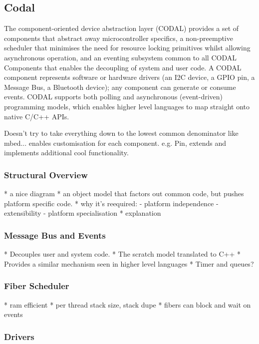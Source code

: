 \subsection{Codal}

The component-oriented device abstraction layer (CODAL) provides a set of components that abstract away microcontroller specifics, a non-preemptive scheduler that minimises the need for resource locking primitives whilst allowing asynchronous operation, and an eventing subsystem common to all CODAL Components that enables the decoupling of system and user code. A CODAL component represents software or hardware drivers (an I2C device, a GPIO pin, a Message Bus, a Bluetooth device); any component can generate or consume events. CODAL supports both polling and asynchronous (event-driven) programming models, which enables higher level languages to map straight onto native C/C++ APIs.

Doesn't try to take everything down to the lowest common denominator like mbed... enables customisation for each component. e.g. Pin, extends and implements additional cool functionality.

\subsubsection{Structural Overview}

* a nice diagram
* an object model that factors out common code, but pushes platform specific code.
* why it's reequired:
    - platform independence
    - extensibility
    - platform specialisation
* explanation

\subsubsection{Message Bus and Events}

* Decouples user and system code.
* The scratch model translated to C++
* Provides a similar mechanism seen in higher level languages
* Timer and queues?

\subsubsection{Fiber Scheduler}

* ram efficient
* per thread stack size, stack dupe
* fibers can block and wait on events

\subsubsection{Drivers}

